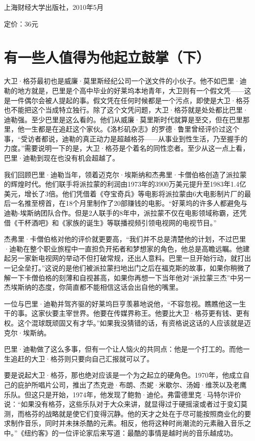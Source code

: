 上海财经大学出版社，2010年5月

定价：36元

\section{有一些人值得为他起立鼓掌（下）}

大卫·格芬最初也是威廉·莫里斯经纪公司一个送文件的小伙子。他不如巴里·迪勒的地方就是，巴里是个高中毕业的好莱坞本地青年，大卫则有一个假文凭------这是一件偶尔会被人提起的事。假文凭在任何时候都是一个污点，即使是大卫·格芬也不能把这个当成特立独行。除了这个文凭问题，大卫·格芬就是处处都比巴里·迪勒强。至少巴里是这么看的。他们从威廉·莫里斯时代就算是至交，但在巴里那里，他一生都是在追赶这个家伙。《洛杉矶杂志》的罗德·鲁里曾经评价过这个事，``受访者都说，迪勒的真正动力是超越格芬------从事业到性生活，乃至握手的力度。''需要说明一下的是，大卫·格芬是个着名的同性恋者。至少从这一点上看，巴里·迪勒到现在也没有机会超越了。

我们回顾巴里·迪勒当年，领着迈克尔·埃斯纳和杰弗里·卡僧伯格创造了派拉蒙的辉煌时代。他们联手将派拉蒙的利润由1973年的3900万美元提升至1983年1.4亿美元，增长了3倍。他们凭借着《夺宝奇兵》等电影将派拉蒙由6大电影制片厂的最后一名推至榜首，在18个月里制作了20部赚钱的电影。``好莱坞的许多人都避免与迪勒-埃斯纳团队合作。但是2人联手的8年中，派拉蒙不仅在电影领域称霸，还凭借《干杯酒吧》和《家族的诞生》等联播视频引领电视网的电视节目。''

杰弗里·卡僧伯格对他的评价就更要高，``我们并不总是清楚他的计划，不过巴里·迪勒在整个职业旅程中一直担负开拓者和梦想家的角色，他总是高瞻远瞩。他建起另一家新电视网的举动不但打破常规，还出人意料。巴里一旦开始行动，就打出一记全垒打。''这说的是他们被派拉蒙扫地出门之后在福克斯的故事，如果你稍微了解一下卡僧伯格的刻薄和自视甚高，如果你再想一下当年他对``派拉蒙三杰''中另一杰埃斯纳的态度，你简直都不能相信这话会出自他的嘴里。

一位与巴里·迪勒并驾齐驱的好莱坞巨亨羡慕地说他，``不容忽视。瞧瞧他这一生干的事。这家伙要主宰世界。他要在传媒界称王。他要比大卫·格芬更有钱、更有权。这个混球既顽固又有才华。''如果我没猜错的话，有资格说这话的人应该就是迈克尔·埃斯纳。

巴里·迪勒做了这么多事，但有一个让人恼火的共同点：他是一个打工的。而他一生追赶的大卫·格芬则只要向自己汇报就可以了。

要是说起大卫·格芬，那也绝对应该是一个为之起立的硬角色。1970年，他成立自己的庇护所唱片公司，推出了杰克逊·布朗、杰妮·米歇尔、汤姆·维茨以及老鹰乐队。但这只是开始，1974年，他发现了鲍勃·迪伦。弗雷德里克·马特尔评价说：``如果没有格芬，这些乐队对于大众来讲，就显得过于硬摇滚或者过于变幻莫测，而格芬的战略就是使它们变得沉静。他的天才之处在于尽可能按照商业化的要求制作音乐，同时并未抹杀酷的元素。相反，他将这种时尚潮流的元素融入音乐之中。''《纽约客》的一位评论家后来写道：最酷的事情是越时尚的音乐越成功。


